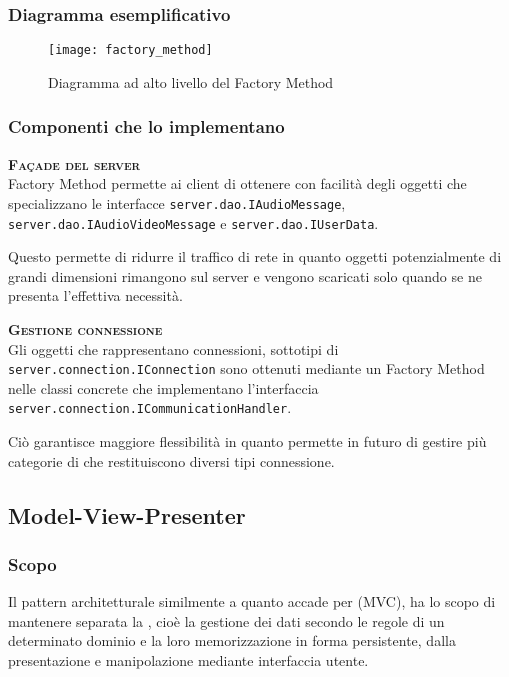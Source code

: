 \subsubsection{Diagramma esemplificativo}
\begin{figure}[H]
\centering
\texttt{[image: factory\_method]}
\caption{Diagramma ad alto livello del  Factory Method}\label{fig:factory_method}
\end{figure}

\subsubsection{Componenti che lo implementano}
\begin{description}
  \item{\scshape\bfseries Façade del server}\\
Factory Method permette ai client di ottenere con facilità degli oggetti  che specializzano le interfacce \texttt{server.dao.IAudioMessage}, \texttt{server.dao.IAudioVideoMessage} e \texttt{server.dao.IUserData}.

Questo permette di ridurre il traffico di rete in quanto oggetti potenzialmente di grandi dimensioni rimangono sul server e vengono scaricati solo quando se ne presenta l'effettiva necessità.
  \item{\scshape\bfseries Gestione connessione}\\
Gli oggetti che rappresentano connessioni, sottotipi di \texttt{server.connection.IConnection} sono ottenuti mediante un Factory Method nelle classi concrete che implementano l'interfaccia \texttt{server.connection.ICommunicationHandler}.

Ciò garantisce maggiore flessibilità in quanto permette in futuro di gestire più categorie di  che restituiscono diversi tipi connessione.
\end{description}

\subsection{Model-View-Presenter}\label{sec:MVP}

\subsubsection{Scopo}
Il pattern architetturale  similmente a quanto accade per  (MVC), ha lo scopo di mantenere separata la , cioè la gestione dei dati secondo le regole di un determinato dominio e la loro memorizzazione in forma persistente, dalla presentazione e manipolazione mediante interfaccia utente.

